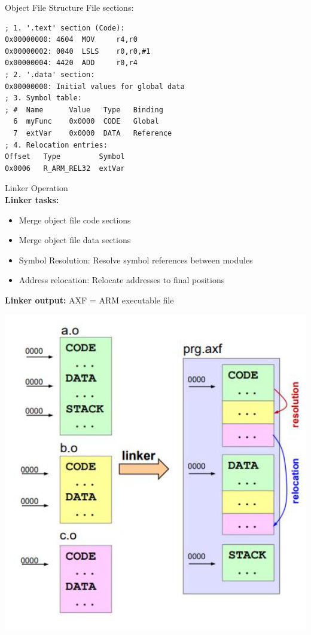 \begin{example2}{Object File Structure}
  File sections:
\begin{lstlisting}[language=armasm, style=basesmol]
; 1. '.text' section (Code):
0x00000000: 4604  MOV     r4,r0
0x00000002: 0040  LSLS    r0,r0,#1
0x00000004: 4420  ADD     r0,r4
; 2. '.data' section:
0x00000000: Initial values for global data
; 3. Symbol table:
; #  Name      Value   Type   Binding
  6  myFunc    0x0000  CODE   Global
  7  extVar    0x0000  DATA   Reference
; 4. Relocation entries:
Offset   Type         Symbol
0x0006   R_ARM_REL32  extVar
\end{lstlisting}
\end{example2}

\begin{concept}{Linker Operation}\\
\textbf{Linker tasks:}
\begin{itemize}
  \item Merge object file code sections
  \item Merge object file data sections
  \item Symbol Resolution: Resolve symbol references between modules
  \item Address relocation: Relocate addresses to final positions
\end{itemize}

\textbf{Linker output:} AXF = ARM executable file

\includegraphics[width=0.8\linewidth]{images/2024_12_29_79e6b22f503fb7b4f718g-10}
\end{concept}

